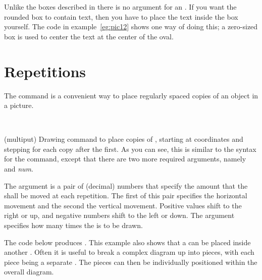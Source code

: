     Unlike the boxes described in  there is no 
argument for an \cmd{\oval}. If you want the rounded box to contain text, 
then you have to place the text inside the box yourself. 
The code in example~\ref{eg:pic12} shows
one way of doing this; a zero-sized box is used to center the text at
the center of the oval.


\section{Repetitions}

    The \cmd{\multiput} command is a convenient way to place regularly spaced
copies of an object 
in a picture.
\begin{syntax}
\cmd{\multiput} \\
\end{syntax}
\glossary(multiput)
{}{Drawing
command to place  copies of , starting at coordinates
 and stepping  for each copy after the first.}
As you can see, this is similar to the syntax for the \cmd{\put} command, 
except that there are two more required arguments, namely  
and \textit{num}.

    The  argument is a pair of (decimal) numbers that
specify the amount that the  shall be moved at each repetition.
The first of this pair specifies the horizontal movement and the second the
vertical movement. Positive values shift to the right or up, and negative
numbers shift to the left or down. The  argument specifies how many
times the  is to be drawn.

    The code below produces . 
This example
also shows that a  can be placed 
inside another .
Often it is useful to break a complex diagram up into pieces, with each
piece being a separate . The pieces can then be individually
positioned within the overall diagram.

